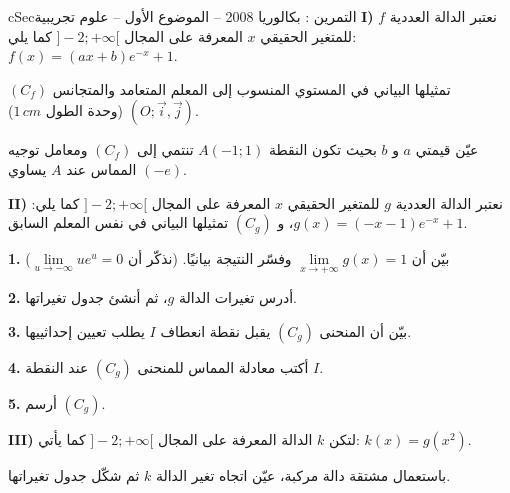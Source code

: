 \documentclass[12pt,a4paper]{article}
\newenvironment{BOX}[2]{\begin{otherlanguage}{english}\begin{arbox}{#1}{#2}}{\end{arbox}\end{otherlanguage}}
\newcounter{exo}
\newenvironment{tamrin}[1]{\stepcounter{exo}\begin{BOX}{cSec}{التمرين \theexo: #1}}{\end{BOX}}
\newcommand{\QQ}[1]{\par\smallskip\textbf{#1.} }
\begin{document}
\begin{tamrin}{بكالوريا 2008 -- الموضوع الأول -- علوم تجريبية}
\textbf{I)} نعتبر الدالة العددية $f$ للمتغير الحقيقي $x$ المعرفة على المجال $]-2;+\infty[$ كما يلي: $f(x)=(ax+b)e^{-x}+1$.

$(C_f)$ تمثيلها البياني في المستوي المنسوب إلى المعلم المتعامد والمتجانس $(O;\vec i,\vec j)$ (وحدة الطول $1\,cm$).

عيّن قيمتي $a$ و $b$ بحيث تكون النقطة $A(-1;1)$ تنتمي إلى $(C_f)$ ومعامل توجيه المماس عند $A$ يساوي $(-e)$.

\textbf{II)} نعتبر الدالة العددية $g$ للمتغير الحقيقي $x$ المعرفة على المجال $]-2;+\infty[$ كما يلي: $g(x)=(-x-1)e^{-x}+1$، و $(C_g)$ تمثيلها البياني في نفس المعلم السابق.

\QQ{1} بيّن أن $\lim\limits_{x\to+\infty}g(x)=1$ وفسّر النتيجة بيانيًا. (نذكّر أن $\lim\limits_{u\to-\infty}ue^u=0$)
\QQ{2} أدرس تغيرات الدالة $g$، ثم أنشئ جدول تغيراتها.
\QQ{3} بيّن أن المنحنى $(C_g)$ يقبل نقطة انعطاف $I$ يطلب تعيين إحداثييها.
\QQ{4} أكتب معادلة المماس للمنحنى $(C_g)$ عند النقطة $I$.
\QQ{5} أرسم $(C_g)$.

\textbf{III)} لتكن $k$ الدالة المعرفة على المجال $]-2;+\infty[$ كما يأتي: $k(x)=g(x^2)$.

باستعمال مشتقة دالة مركبة، عيّن اتجاه تغير الدالة $k$ ثم شكّل جدول تغيراتها.
\end{tamrin}
\end{document}
